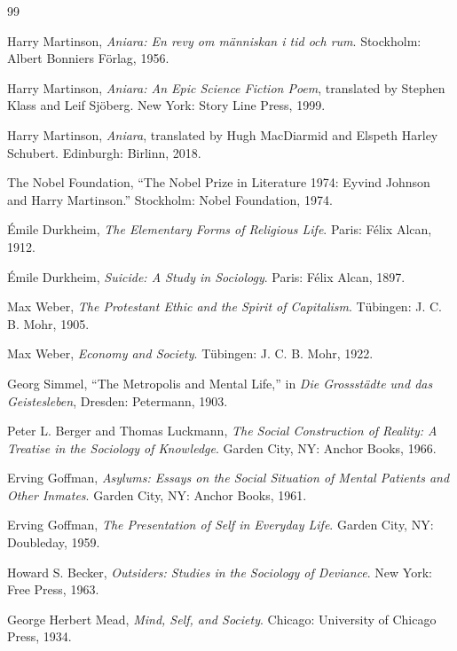 \documentclass[11pt,oneside]{book}
\theoremstyle{definition}
\theoremstyle{remark}
\begin{document}
\newpage
\begin{thebibliography}{99}

 Harry Martinson, \emph{Aniara: En revy om människan i tid och rum}. Stockholm: Albert Bonniers
  Förlag, 1956.

 Harry Martinson, \emph{Aniara: An Epic Science Fiction Poem}, translated by Stephen Klass and
  Leif Sj\"oberg. New York: Story Line Press, 1999.

 Harry Martinson, \emph{Aniara}, translated by Hugh MacDiarmid and Elspeth Harley Schubert.
  Edinburgh: Birlinn, 2018.

 The Nobel Foundation, ``The Nobel Prize in Literature 1974: Eyvind Johnson and Harry
  Martinson.'' Stockholm: Nobel Foundation, 1974.

 \'Emile Durkheim, \emph{The Elementary Forms of Religious Life}. Paris: F\'elix Alcan, 1912.

 \'Emile Durkheim, \emph{Suicide: A Study in Sociology}. Paris: F\'elix Alcan, 1897.

 Max Weber, \emph{The Protestant Ethic and the Spirit of Capitalism}. T\"ubingen: J. C. B. Mohr,
  1905.

 Max Weber, \emph{Economy and Society}. T\"ubingen: J. C. B. Mohr, 1922.

 Georg Simmel, ``The Metropolis and Mental Life,'' in \emph{Die Grossst\"adte und das
  Geistesleben}, Dresden: Petermann, 1903.

 Peter L. Berger and Thomas Luckmann, \emph{The Social Construction of Reality: A Treatise in the
  Sociology of Knowledge}. Garden City, NY: Anchor Books, 1966.

 Erving Goffman, \emph{Asylums: Essays on the Social Situation of Mental Patients and Other
  Inmates}. Garden City, NY: Anchor Books, 1961.

 Erving Goffman, \emph{The Presentation of Self in Everyday Life}. Garden City, NY: Doubleday,
  1959.

 Howard S. Becker, \emph{Outsiders: Studies in the Sociology of Deviance}. New York: Free Press,
  1963.

 George Herbert Mead, \emph{Mind, Self, and Society}. Chicago: University of Chicago Press, 1934.


\end{thebibliography}
\end{document}
